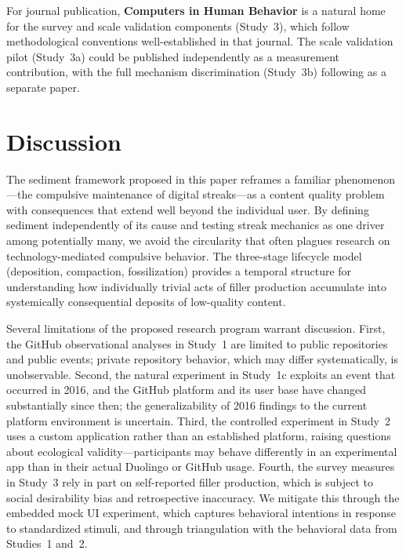 \documentclass[12pt]{article}
\begin{document}
For journal publication, \textbf{Computers in Human Behavior} is a natural home for the survey and scale validation components (Study~3), which follow methodological conventions well-established in that journal. The scale validation pilot (Study~3a) could be published independently as a measurement contribution, with the full mechanism discrimination (Study~3b) following as a separate paper.

\section{Discussion}
\label{sec:discussion}

The sediment framework proposed in this paper reframes a familiar phenomenon---the compulsive maintenance of digital streaks---as a content quality problem with consequences that extend well beyond the individual user. By defining sediment independently of its cause and testing streak mechanics as one driver among potentially many, we avoid the circularity that often plagues research on technology-mediated compulsive behavior. The three-stage lifecycle model (deposition, compaction, fossilization) provides a temporal structure for understanding how individually trivial acts of filler production accumulate into systemically consequential deposits of low-quality content.

Several limitations of the proposed research program warrant discussion. First, the GitHub observational analyses in Study~1 are limited to public repositories and public events; private repository behavior, which may differ systematically, is unobservable. Second, the natural experiment in Study~1c exploits an event that occurred in 2016, and the GitHub platform and its user base have changed substantially since then; the generalizability of 2016 findings to the current platform environment is uncertain. Third, the controlled experiment in Study~2 uses a custom application rather than an established platform, raising questions about ecological validity---participants may behave differently in an experimental app than in their actual Duolingo or GitHub usage. Fourth, the survey measures in Study~3 rely in part on self-reported filler production, which is subject to social desirability bias and retrospective inaccuracy. We mitigate this through the embedded mock UI experiment, which captures behavioral intentions in response to standardized stimuli, and through triangulation with the behavioral data from Studies~1 and~2.
\end{document}
